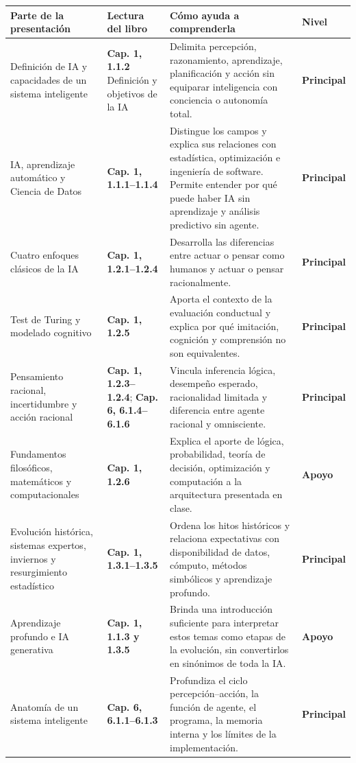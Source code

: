 \documentclass[10pt,a4paper]{article}
\newcommand{\capitulo}[1]{\textbf{\color{UAPTeal}#1}}
\newcommand{\principal}{\textbf{Principal}}
\newcommand{\apoyo}{\textbf{Apoyo}}
\newcommand{\encabezadotabla}{%
  \rowcolor{UAPNavy}
  \color{white}\textbf{Parte de la presentación} &
  \color{white}\textbf{Lectura del libro} &
  \color{white}\textbf{Cómo ayuda a comprenderla} &
  \color{white}\textbf{Nivel} \\
  \endhead
}
\begin{document}
\begin{longtable}{P{3.35cm}P{4.05cm}P{6.25cm}P{2.15cm}}
\toprule
\encabezadotabla
\midrule
Definición de IA y capacidades de un sistema inteligente & \capitulo{Cap. 1, 1.1.2} Definición y objetivos de la IA & Delimita percepción, razonamiento, aprendizaje, planificación y acción sin equiparar inteligencia con conciencia o autonomía total. & \principal \\
IA, aprendizaje automático y Ciencia de Datos & \capitulo{Cap. 1, 1.1.1--1.1.4} & Distingue los campos y explica sus relaciones con estadística, optimización e ingeniería de software. Permite entender por qué puede haber IA sin aprendizaje y análisis predictivo sin agente. & \principal \\
Cuatro enfoques clásicos de la IA & \capitulo{Cap. 1, 1.2.1--1.2.4} & Desarrolla las diferencias entre actuar o pensar como humanos y actuar o pensar racionalmente. & \principal \\
Test de Turing y modelado cognitivo & \capitulo{Cap. 1, 1.2.5} & Aporta el contexto de la evaluación conductual y explica por qué imitación, cognición y comprensión no son equivalentes. & \principal \\
Pensamiento racional, incertidumbre y acción racional & \capitulo{Cap. 1, 1.2.3--1.2.4}; \capitulo{Cap. 6, 6.1.4--6.1.6} & Vincula inferencia lógica, desempeño esperado, racionalidad limitada y diferencia entre agente racional y omnisciente. & \principal \\
Fundamentos filosóficos, matemáticos y computacionales & \capitulo{Cap. 1, 1.2.6} & Explica el aporte de lógica, probabilidad, teoría de decisión, optimización y computación a la arquitectura presentada en clase. & \apoyo \\
Evolución histórica, sistemas expertos, inviernos y resurgimiento estadístico & \capitulo{Cap. 1, 1.3.1--1.3.5} & Ordena los hitos históricos y relaciona expectativas con disponibilidad de datos, cómputo, métodos simbólicos y aprendizaje profundo. & \principal \\
Aprendizaje profundo e IA generativa & \capitulo{Cap. 1, 1.1.3 y 1.3.5} & Brinda una introducción suficiente para interpretar estos temas como etapas de la evolución, sin convertirlos en sinónimos de toda la IA. & \apoyo \\
Anatomía de un sistema inteligente & \capitulo{Cap. 6, 6.1.1--6.1.3} & Profundiza el ciclo percepción--acción, la función de agente, el programa, la memoria interna y los límites de la implementación. & \principal \\

\end{longtable}
\end{document}
